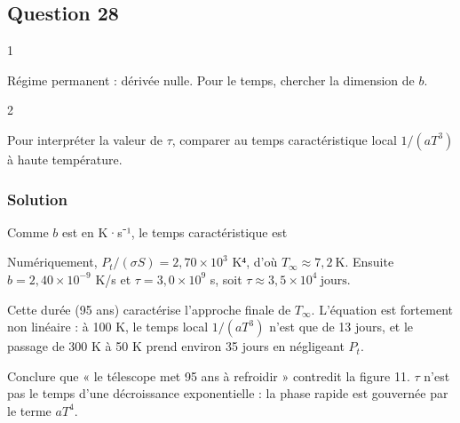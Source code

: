 \documentclass[11pt,a4paper]{article}
\newcommand{\equationajustee}[1]{%
  \sbox{\boiteequation}{$\displaystyle #1$}%
  \ifdim\wd\boiteequation>\linewidth
    \[\resizebox{\linewidth}{!}{\usebox{\boiteequation}}\]%
  \else
    \[#1\]%
  \fi}
\begin{document}
\hypertarget{question-28}{%
\subsection{Question 28}\label{question-28}}

\begin{indication}{1}

Régime permanent : dérivée nulle. Pour le temps, chercher la dimension de \(b\).

\end{indication}

\begin{indication}{2}

Pour interpréter la valeur de \(\tau\), comparer au temps caractéristique local \(1/(aT^3)\) à haute température.

\end{indication}

\hypertarget{solution-27}{%
\subsubsection{Solution}\label{solution-27}}

\equationajustee{\boxed{\begin{aligned}
T_\infty &= \left(\frac ba\right)^{1/4}\\
&= \left(\frac{P_t}{\sigma S}\right)^{1/4}
\end{aligned}}}

Comme \(b\) est en K·s⁻¹, le temps caractéristique est

\equationajustee{\boxed{\begin{aligned}
\tau &= \frac{T_\infty}{b}\\
&= \frac{1}{aT_\infty^3}
\end{aligned}}}

Numériquement, \(P_t/(\sigma S) = 2{,}70\times10^3\) K⁴, d'où \(\boxed{T_\infty\approx7{,}2\ \text{K}}\). Ensuite \(b = 2{,}40\times10^{-9}\) K/s et \(\tau = 3{,}0\times10^9\) s, soit \(\boxed{\tau\approx3{,}5\times10^4\ \text{jours}}\).

Cette durée (95 ans) caractérise l'approche finale de \(T_\infty\). L'équation est fortement non linéaire : à 100 K, le temps local \(1/(aT^3)\) n'est que de 13 jours, et le passage de 300 K à 50 K prend environ 35 jours en négligeant \(P_t\).

\begin{piege}

Conclure que « le télescope met 95 ans à refroidir » contredit la figure 11. \(\tau\) n'est pas le temps d'une décroissance exponentielle : la phase rapide est gouvernée par le terme \(aT^4\).

\end{piege}
\end{document}
